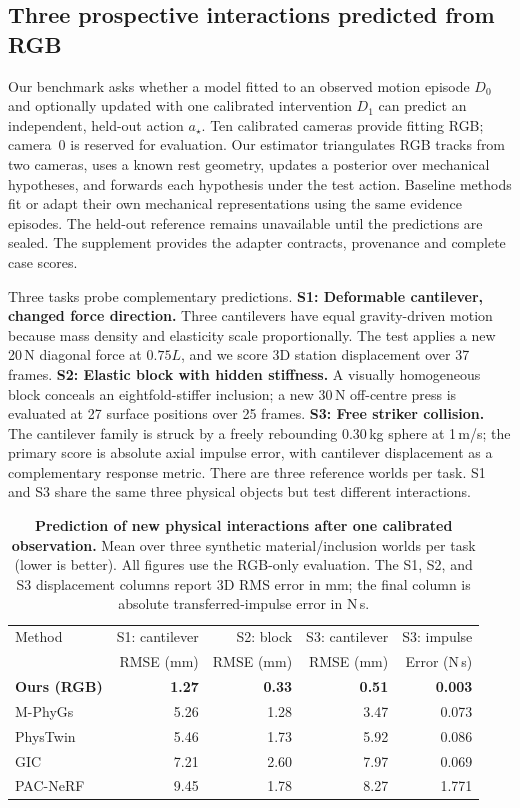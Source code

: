 \subsection{Three prospective interactions predicted from RGB}
\label{sec:rgb-comparison}
Our benchmark asks whether a model fitted to an observed motion episode $D_0$ and optionally updated with one calibrated intervention $D_1$ can predict an independent, held-out action $a_\star$. Ten calibrated cameras provide fitting RGB; camera~0 is reserved for evaluation. Our estimator triangulates RGB tracks from two cameras, uses a known rest geometry, updates a posterior over mechanical hypotheses, and forwards each hypothesis under the test action. Baseline methods fit or adapt their own mechanical representations using the same evidence episodes. The held-out reference remains unavailable until the predictions are sealed. The supplement provides the adapter contracts, provenance and complete case scores.

Three tasks probe complementary predictions. \textbf{S1: Deformable cantilever, changed force direction.} Three cantilevers have equal gravity-driven motion because mass density and elasticity scale proportionally. The test applies a new 20\,N diagonal force at $0.75L$, and we score 3D station displacement over 37 frames. \textbf{S2: Elastic block with hidden stiffness.} A visually homogeneous block conceals an eightfold-stiffer inclusion; a new 30\,N off-centre press is evaluated at 27 surface positions over 25 frames. \textbf{S3: Free striker collision.} The cantilever family is struck by a freely rebounding 0.30\,kg sphere at 1\,m/s; the primary score is absolute axial impulse error, with cantilever displacement as a complementary response metric. There are three reference worlds per task. S1 and S3 share the same three physical objects but test different interactions.

\begin{table}[t]
\centering
\caption{\textbf{Prediction of new physical interactions after one calibrated observation.} Mean over three synthetic material/inclusion worlds per task (lower is better). All figures use the RGB-only evaluation. The S1, S2, and S3 displacement columns report 3D RMS error in mm; the final column is absolute transferred-impulse error in N\,s.}
\label{tab:benchmark}
\setlength{\tabcolsep}{7pt}
\begin{tabular}{@{}lrrrr@{}}
\toprule
Method & S1: cantilever & S2: block & S3: cantilever & S3: impulse\\
 & RMSE (mm)& RMSE (mm)& RMSE (mm)& Error (N\,s)\\
\midrule
\textbf{Ours (RGB)} & \textbf{1.27} & \textbf{0.33} & \textbf{0.51} & \textbf{0.003}\\
M-PhyGs~\cite{wada2026mphygs} & 5.26 & 1.28 & 3.47 & 0.073\\
PhysTwin~\cite{jiang2025phystwin} & 5.46 & 1.73 & 5.92 & 0.086\\
GIC~\cite{cai2024gic} & 7.21 & 2.60 & 7.97 & 0.069\\
PAC-NeRF~\cite{li2023pacnerf} & 9.45 & 1.78 & 8.27 & 1.771\\
\bottomrule
\end{tabular}
\end{table}

